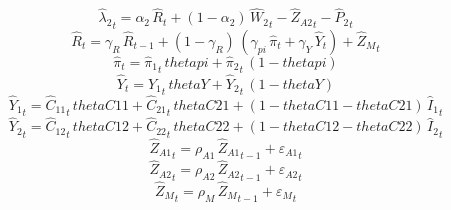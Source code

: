 \begin{dmath}
{{\hat{\lambda}_{2}}}_{t}={{\alpha_{2}}}\, {{\hat{R}}}_{t}+\left(1-{{\alpha_{2}}}\right)\, {{\hat{W}_{2}}}_{t}-{{\hat{Z}_{A2}}}_{t}-{{\hat{P}_{2}}}_{t}
\end{dmath}
\begin{dmath}
{{\hat{R}}}_{t}={{\gamma_{R}}}\, {{\hat{R}}}_{t-1}+\left(1-{{\gamma_{R}}}\right)\, \left({{\gamma_{pi}}}\, {{\hat{\pi}}}_{t}+{{\gamma_{Y}}}\, {{\hat{Y}}}_{t}\right)+{{\hat{Z}_M}}_{t}
\end{dmath}
\begin{dmath}
{{\hat{\pi}}}_{t}={{\hat{\pi}_{1}}}_{t}\, {thetapi}+{{\hat{\pi}_{2}}}_{t}\, \left(1-{thetapi}\right)
\end{dmath}
\begin{dmath}
{{\hat{Y}}}_{t}={{\hat{Y}_{1}}}_{t}\, {thetaY}+{{\hat{Y}_{2}}}_{t}\, \left(1-{thetaY}\right)
\end{dmath}
\begin{dmath}
{{\hat{Y}_{1}}}_{t}={{\hat{C}_{11}}}_{t}\, {thetaC11}+{{\hat{C}_{21}}}_{t}\, {thetaC21}+\left(1-{thetaC11}-{thetaC21}\right)\, {{\hat{I}_{1}}}_{t}
\end{dmath}
\begin{dmath}
{{\hat{Y}_{2}}}_{t}={{\hat{C}_{12}}}_{t}\, {thetaC12}+{{\hat{C}_{22}}}_{t}\, {thetaC22}+\left(1-{thetaC12}-{thetaC22}\right)\, {{\hat{I}_{2}}}_{t}
\end{dmath}
\begin{dmath}
{{\hat{Z}_{A1}}}_{t}={{\rho_{A1}}}\, {{\hat{Z}_{A1}}}_{t-1}+{{\varepsilon_{A1}}}_{t}
\end{dmath}
\begin{dmath}
{{\hat{Z}_{A2}}}_{t}={{\rho_{A2}}}\, {{\hat{Z}_{A2}}}_{t-1}+{{\varepsilon_{A2}}}_{t}
\end{dmath}
\begin{dmath}
{{\hat{Z}_M}}_{t}={{\rho_{M}}}\, {{\hat{Z}_M}}_{t-1}+{{\varepsilon_{M}}}_{t}
\end{dmath}
